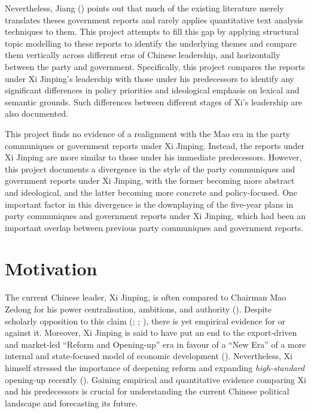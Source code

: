 \documentclass[
  letterpaper,
  abstract=true]{scrartcl}
\begin{document}
Nevertheless, Jiang () points out that
much of the existing literature merely translates theses government
reports and rarely applies quantitative text analysis techniques to
them. This project attempts to fill this gap by applying structural
topic modelling to these reports to identify the underlying themes and
compare them vertically across different eras of Chinese leadership, and
horizontally between the party and government. Specifically, this
project compares the reports under Xi Jinping's leadership with those
under his predecessors to identify any significant differences in policy
priorities and ideological emphasis on lexical and semantic grounds.
Such differences between different stages of Xi's leadership are also
documented.

This project finds no evidence of a realignment with the Mao era in the
party communiques or government reports under Xi Jinping. Instead, the
reports under Xi Jinping are more similar to those under his immediate
predecessors. However, this project documents a divergence in the style
of the party communiques and government reports under Xi Jinping, with
the former becoming more abstract and ideological, and the latter
becoming more concrete and policy-focused. One important factor in this
divergence is the downplaying of the five-year plans in party
communiques and government reports under Xi Jinping, which had been an
important overlap between previous party communiques and government
reports.

\section{Motivation}\label{motivation}

The current Chinese leader, Xi Jinping, is often compared to Chairman
Mao Zedong for his power centralisation, ambitions, and authority
(). Despite scholarly
opposition to this claim (;
;
), there is yet
empirical evidence for or against it. Moreover, Xi Jinping is said to
have put an end to the export-driven and market-led ``Reform and
Opening-up'' era in favour of a ``New Era'' of a more internal and
state-focused model of economic development (). Nevertheless, Xi himself stressed the importance of deepening
reform and expanding \emph{high-standard} opening-up recently
(). Gaining empirical and
quantitative evidence comparing Xi and his predecessors is crucial for
understanding the current Chinese political landscape and forecasting
its future.
\end{document}
